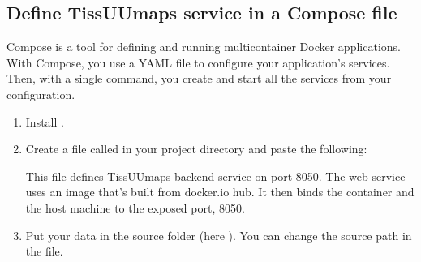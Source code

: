 \documentclass[letterpaper,10pt,english,openany,oneside]{sphinxmanual}
\begin{document}
\subsection{Define TissUUmaps service in a Compose file}
\label{\detokenize{docs/sharing/docker:define-tissuumaps-service-in-a-compose-file}}
\sphinxAtStartPar
Compose is a tool for defining and running multi\sphinxhyphen{}container Docker applications. With Compose, you use a YAML file to configure your application’s services. Then, with a single command, you create and start all the services from your configuration.

\sphinxAtStartPar
{}
\begin{enumerate}
%
\item {} 
\sphinxAtStartPar
Install .

\item {} 
\sphinxAtStartPar
Create a file called  in your project directory and paste the following:

\begin{sphinxVerbatim}[commandchars=\\\{\}]
 
     
        
         
         
     
       
\end{sphinxVerbatim}

\sphinxAtStartPar
This  file defines TissUUmaps backend service on port 8050.
The web service uses an image that’s built from docker.io hub. It then binds the container and the host machine to the exposed port, 8050.

\item {} 
\sphinxAtStartPar
Put your data in the source folder (here ). You can change the source path in the  file.


\end{enumerate}
\end{document}
